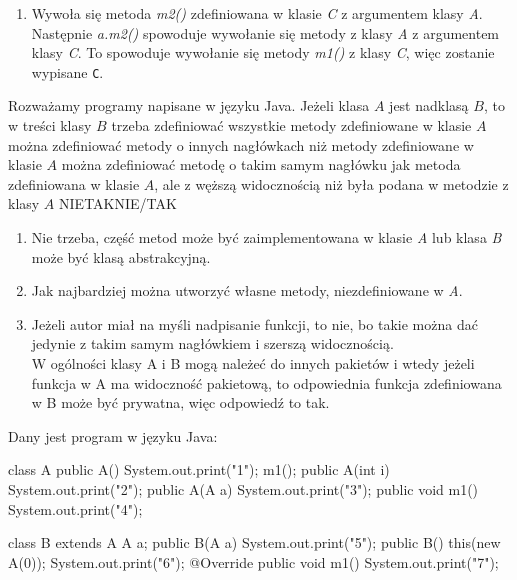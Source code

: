 \begin{solutions}
\begin{enumerate}[\bf A.]
        \item Wywoła się metoda \textit{m2()} zdefiniowana w klasie \textit{C} z argumentem klasy \textit{A}. Następnie \textit{a.m2()} spowoduje wywołanie się metody z klasy \textit{A} z argumentem klasy \textit{C}. To spowoduje wywołanie się metody \textit{m1()} z klasy \textit{C}, więc zostanie wypisane \texttt{C}.
    \end{enumerate}

    \sol Rozważamy programy napisane w języku Java. Jeżeli klasa $A$ jest nadklasą $B$, to w treści klasy $B$
    \answerss
    {trzeba zdefiniować wszystkie metody zdefiniowane w klasie $A$}
    {można zdefiniować metody o innych nagłówkach niż metody zdefiniowane w klasie $A$}
    {można zdefiniować metodę o takim samym nagłówku jak metoda zdefiniowana w klasie $A$, ale z węższą widocznością niż była podana w metodzie z klasy $A$}
    {NIE}{TAK}{NIE/TAK}

    \begin{enumerate}[\bf A.]
        \item Nie trzeba, część metod może być zaimplementowana w klasie \textit{A} lub klasa \textit{B} może być klasą abstrakcyjną.

        \item Jak najbardziej można utworzyć własne metody, niezdefiniowane w \textit{A}.

        \item Jeżeli autor miał na myśli nadpisanie funkcji, to nie, bo takie można dać jedynie z takim samym nagłówkiem i szerszą widocznością.\\
        W ogólności klasy A i B mogą należeć do innych pakietów i wtedy jeżeli funkcja w A ma widoczność pakietową, to odpowiednia funkcja zdefiniowana w B może być prywatna, więc odpowiedź to tak.
        
    \end{enumerate}

    \sol Dany jest program w języku Java:
    \begin{java}
        class A {
            public A() { System.out.print("1"); m1(); }
            public A(int i) { System.out.print("2"); }
            public A(A a) { System.out.print("3"); }
            public void m1() { System.out.print("4"); }
        }

        class B extends A {
            A a;
            public B(A a) { System.out.print("5"); }
            public B() { this(new A(0)); System.out.print("6"); }
            @Override
            public void m1() { System.out.print("7"); }
        }


\end{java}
\end{solutions}
